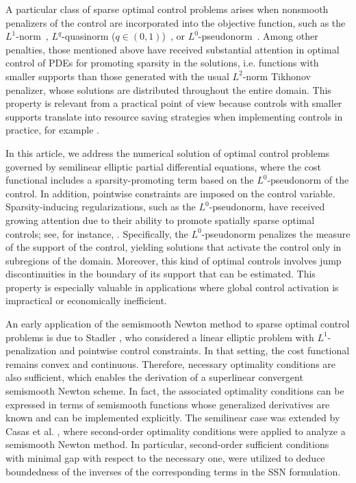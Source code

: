 \documentclass[11pt,a4paper]{amsart}
\begin{document}
A particular class of sparse optimal control problems arises when nonsmooth penalizers of the control are incorporated into the objective function, such as the $L^1$-norm~\cite{stadler2006}, $L^q$-quasinorm ($q\in (0,1)$)~\cite{itokun2014, Merino2019}, or $L^0$-pseudonorm~\cite{wachsmuth19,CasasMateos2024}. Among other penalties, those mentioned above have received substantial attention in optimal control of PDEs for promoting sparsity in the solutions, i.e. functions with smaller supports than those generated with the usual $L^2$-norm Tikhonov penalizer, whose solutions are distributed throughout the entire domain. This property is relevant from a practical point of view because controls with smaller supports translate into resource saving strategies when implementing controls in practice, for example \cite{herme24}.

In this article, we address the numerical solution of optimal control problems governed by semilinear elliptic partial differential equations, where the cost functional includes a sparsity-promoting term based on the $L^0$-pseudonorm of the control. In addition, pointwise constraints are imposed on the control variable. Sparsity-inducing regularizations, such as the $L^0$-pseudonorm, have received growing attention due to their ability to promote spatially sparse optimal controls; see, for instance, \cite{itokun2014, wachsmuth19}. Specifically, the $L^0$-pseudonorm penalizes the measure of the support of the control, yielding solutions that activate the control only in subregions of the domain. Moreover, this kind of optimal controls involves jump discontinuities in the boundary of its support that can be estimated. This property is especially valuable in applications where global control activation is impractical or economically inefficient.

An early application of the semismooth Newton method to sparse optimal control problems is due to Stadler \cite{stadler2006}, who considered a linear elliptic problem with $L^1$-penalization and pointwise control constraints. In that setting, the cost functional remains convex and continuous. Therefore, necessary optimality conditions are also sufficient, which enables the derivation of a superlinear convergent semismooth Newton scheme. In fact, the associated optimality conditions can be expressed in terms of semismooth functions whose generalized derivatives are known and can be implemented explicitly. The semilinear case was extended by Casas et al. \cite{CasasMateos2024}, where second-order optimality conditions were applied to analyze a semismooth Newton method. In particular, second-order sufficient conditions with minimal gap with respect to the necessary one, were utilized to deduce boundedness of the inverses of the corresponding terms in the SSN formulation.  
\end{document}
